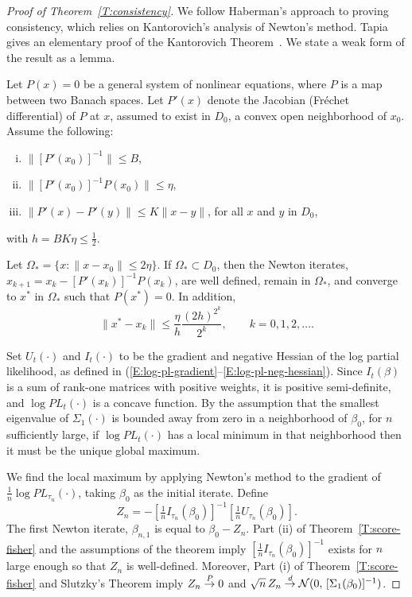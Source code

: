 \documentclass[aoas,preprint]{imsart}
\begin{document}
\begin{proof}[Proof of Theorem~\ref{T:consistency}]
We follow Haberman's approach to proving
consistency, which relies on Kantorovich's analysis
of Newton's method.  Tapia gives an elementary proof of the Kantorovich
Theorem~\cite{haberman1977maximum,kantorovich1952functional,tapia1971kantorovich}.
We state a weak form of the result as a lemma.

\begin{lemma}\label{L:kantorovich}
    Let $P(x) = 0$ be a general system of nonlinear equations, where $P$ is
    a map between two Banach spaces.  Let $P'(x)$ denote the Jacobian
    (Fr\'echet differential) of $P$ at $x$, assumed to exist in $D_0$,
    a convex open neighborhood of $x_0$.  Assume the following:
    \begin{enumerate}[(i)]
        \item $\| [P'(x_0)]^{-1} \| \leq B$,
        \item $\| [P'(x_0)]^{-1} P(x_0) \| \leq \eta$,
        \item $\| P'(x) - P'(y) \| \leq K \| x - y \|$,\quad
            for all $x$ and $y$ in $D_0$,
    \end{enumerate}
    with $h = B K \eta \leq \tfrac{1}{2}$.

    Let $\Omega_\ast = \{ x : \| x - x_0 \| \leq 2 \eta \}$.
    If $\Omega_\ast \subset D_0$, then the Newton iterates,
    $x_{k+1} = x_k - [P'(x_k)]^{-1} P(x_k)$, are well defined, remain
    in $\Omega_\ast$, and converge to $x^\ast$ in $\Omega_\ast$ such
    that $P(x^\ast) = 0$.  In addition,
    \[
        \| x^\ast - x_k \|
            \leq
                \frac{\eta}{h}
                \frac{(2h)^{2^k}}{2^k},
        \qquad
        k = 0, 1, 2, \ldots.
    \]
\end{lemma}

Set $U_t(\cdot)$ and $I_t(\cdot)$ to be the gradient and negative
Hessian of the log partial likelihood, as defined in
(\ref{E:log-pl-gradient}--\ref{E:log-pl-neg-hessian}).  Since
$I_t(\beta)$ is a sum of rank-one matrices with positive weights,
it is positive semi-definite, and $\log \mathit{PL}_t(\cdot)$ is
a concave function.  By the assumption that the smallest
eigenvalue of $\Sigma_1(\cdot)$ is bounded away from zero in a neighborhood
of $\beta_0$, for $n$ sufficiently large, if $\log \mathit{PL}_t(\cdot)$ has a 
local minimum in that neighborhood then it must be the unique global maximum.

We find the local maximum by applying Newton's method to the
gradient of $\tfrac{1}{n} \log \mathit{PL}_{\tau_n}(\cdot)$, taking
$\beta_0$ as the initial iterate.  Define
\[
   Z_n = -[\tfrac{1}{n} I_{\tau_n}(\beta_0)]^{-1} [ \tfrac{1}{n} U_{\tau_n}(\beta_0)].
\]
The first Newton iterate, $\beta_{n,1}$ is equal to $\beta_0 - Z_n$.
Part (ii) of Theorem~\ref{T:score-fisher} and the
assumptions of the theorem imply $[\tfrac{1}{n} I_{\tau_n}(\beta_0)]^{-1}$
exists for $n$ large enough so that $Z_n$ is well-defined.  
Moreover, Part (i) of Theorem~\ref{T:score-fisher} and Slutzky's Theorem imply
$Z_n \overset{\mathit{P}}{\to} 0$ and
$\sqrt{n} \, Z_n \overset{\mathit{d}}{\to} \mathcal{N}(0,\, [\Sigma_1(\beta_0)]^{-1})$.



\end{proof}
\end{document}
